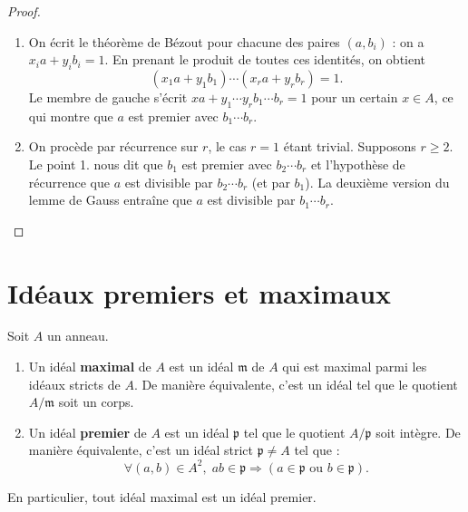 \documentclass[]{report}
\begin{document}
\begin{proof}
    \begin{enumerate}
        \item On écrit le théorème de Bézout pour chacune des paires $(a, b_i)$ : on a $x_i a + y_i b_i = 1$. En prenant le produit de toutes ces identités, on obtient
        \[(x_1 a + y_1 b_1) \cdots (x_r a + y_r b_r) = 1.\]
        Le membre de gauche s'écrit $xa + y_1 \cdots y_r b_1 \cdots b_r = 1$ pour un certain $x \in A$, ce qui montre que $a$ est premier avec $b_1 \cdots b_r$.
        \item On procède par récurrence sur $r$, le cas $r = 1$ étant trivial. Supposons $r \ge 2$. Le point 1. nous dit que $b_1$ est premier avec $b_2 \cdots b_r$ et l'hypothèse de récurrence que $a$ est divisible par $b_2 \cdots b_r$ (et par $b_1$). La deuxième version du lemme de Gauss entraîne que $a$ est divisible par $b_1 \cdots b_r$.
    \end{enumerate}
\end{proof}

\section{Idéaux premiers et maximaux}

\begin{df}{}{}
    Soit $A$ un anneau.
    \begin{enumerate}
        \item[(i)] Un idéal \textbf{maximal} de $A$ est un idéal $\mathfrak{m}$ de $A$ qui est maximal parmi les idéaux stricts de $A$. De manière équivalente, c'est un idéal tel que le quotient $A/\mathfrak{m}$ soit un corps.
        \item[(ii)] Un idéal \textbf{premier} de $A$ est un idéal $\mathfrak{p}$ tel que le quotient $A/\mathfrak{p}$ soit intègre. De manière équivalente, c'est un idéal strict $\mathfrak{p} \neq A$ tel que :
        \[\forall (a, b) \in A^2, \; ab \in \mathfrak{p} \Rightarrow (a \in \mathfrak{p} \text{ ou } b \in \mathfrak{p}).\]
    \end{enumerate}
    En particulier, tout idéal maximal est un idéal premier.
\end{df}
\end{document}
